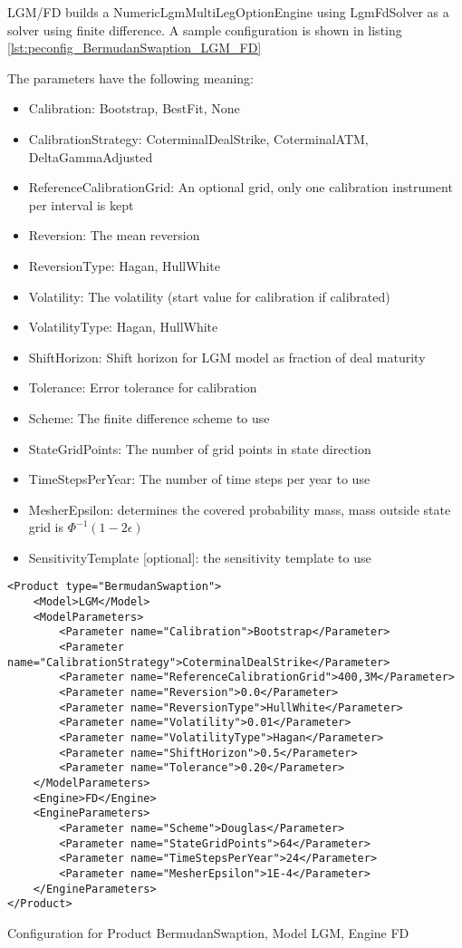 LGM/FD builds a NumericLgmMultiLegOptionEngine using LgmFdSolver as a solver using finite difference. A sample
configuration is shown in listing \ref{lst:peconfig_BermudanSwaption_LGM_FD}

The parameters have the following meaning:

\begin{itemize}
\item Calibration: Bootstrap, BestFit, None
\item CalibrationStrategy: CoterminalDealStrike, CoterminalATM, DeltaGammaAdjusted
\item ReferenceCalibrationGrid: An optional grid, only one calibration instrument per interval is kept
\item Reversion: The mean reversion
\item ReversionType: Hagan, HullWhite
\item Volatility: The volatility (start value for calibration if calibrated)
\item VolatilityType: Hagan, HullWhite
\item ShiftHorizon: Shift horizon for LGM model as fraction of deal maturity
\item Tolerance: Error tolerance for calibration
\item Scheme: The finite difference scheme to use
\item StateGridPoints: The number of grid points in state direction
\item TimeStepsPerYear: The number of time steps per year to use
\item MesherEpsilon: determines the covered probability mass, mass outside state grid is $\Phi^{-1}(1-2\epsilon)$
\item SensitivityTemplate [optional]: the sensitivity template to use 
\end{itemize}

\begin{longlisting}
\begin{verbatim}
<Product type="BermudanSwaption">
    <Model>LGM</Model>
    <ModelParameters>
        <Parameter name="Calibration">Bootstrap</Parameter>
        <Parameter name="CalibrationStrategy">CoterminalDealStrike</Parameter>
        <Parameter name="ReferenceCalibrationGrid">400,3M</Parameter>
        <Parameter name="Reversion">0.0</Parameter>
        <Parameter name="ReversionType">HullWhite</Parameter>
        <Parameter name="Volatility">0.01</Parameter>
        <Parameter name="VolatilityType">Hagan</Parameter>
        <Parameter name="ShiftHorizon">0.5</Parameter>
        <Parameter name="Tolerance">0.20</Parameter>
    </ModelParameters>
    <Engine>FD</Engine>
    <EngineParameters>
        <Parameter name="Scheme">Douglas</Parameter>
        <Parameter name="StateGridPoints">64</Parameter>
        <Parameter name="TimeStepsPerYear">24</Parameter>
        <Parameter name="MesherEpsilon">1E-4</Parameter>
    </EngineParameters>
</Product>
\end{verbatim}
\caption{Configuration for Product BermudanSwaption, Model LGM, Engine FD}
\label{lst:peconfig_BermudanSwaption_LGM_FD}
\end{longlisting}

